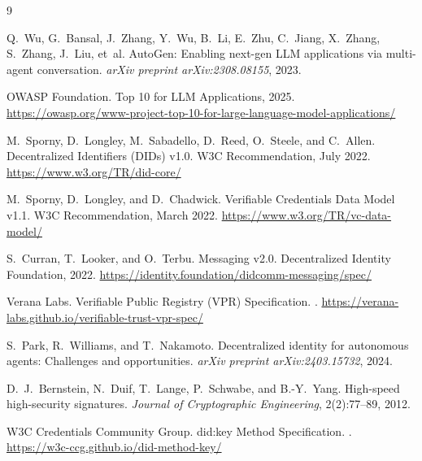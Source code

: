 \documentclass[11pt]{article}
\begin{document}

\begin{thebibliography}{9}

Q.~Wu, G.~Bansal, J.~Zhang, Y.~Wu, B.~Li, E.~Zhu, C.~Jiang, X.~Zhang, S.~Zhang, J.~Liu, et~al.
\newblock Auto{G}en: Enabling next-gen {LLM} applications via multi-agent conversation.
\newblock \emph{arXiv preprint arXiv:2308.08155}, 2023.

{OWASP Foundation}.
 Top 10 for {LLM} Applications, 2025.
\newblock \url{https://owasp.org/www-project-top-10-for-large-language-model-applications/}

M.~Sporny, D.~Longley, M.~Sabadello, D.~Reed, O.~Steele, and C.~Allen.
\newblock Decentralized Identifiers ({DIDs}) v1.0.
\newblock W3C Recommendation, July 2022.
\newblock \url{https://www.w3.org/TR/did-core/}

M.~Sporny, D.~Longley, and D.~Chadwick.
\newblock Verifiable Credentials Data Model v1.1.
\newblock W3C Recommendation, March 2022.
\newblock \url{https://www.w3.org/TR/vc-data-model/}

S.~Curran, T.~Looker, and O.~Terbu.
 Messaging v2.0.
\newblock Decentralized Identity Foundation, 2022.
\newblock \url{https://identity.foundation/didcomm-messaging/spec/}

{Verana Labs}.
\newblock Verifiable Public Registry ({VPR}) Specification.
.
\newblock \url{https://verana-labs.github.io/verifiable-trust-vpr-spec/}

S.~Park, R.~Williams, and T.~Nakamoto.
\newblock Decentralized identity for autonomous agents: Challenges and opportunities.
\newblock \emph{arXiv preprint arXiv:2403.15732}, 2024.

D.~J.~Bernstein, N.~Duif, T.~Lange, P.~Schwabe, and B.-Y.~Yang.
\newblock High-speed high-security signatures.
\newblock \emph{Journal of Cryptographic Engineering}, 2(2):77--89, 2012.

{W3C Credentials Community Group}.
\newblock did:key Method Specification.
.
\newblock \url{https://w3c-ccg.github.io/did-method-key/}

\end{thebibliography}
\end{document}
